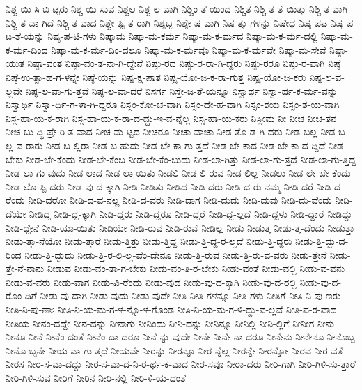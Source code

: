 {ನಿಶ್ಚ-ಯಿ-ಸಿ-ಬಿ-ಟ್ಟರು
ನಿಶ್ಚ-ಯಿ-ಸುವ
ನಿಶ್ಚಲ
ನಿಶ್ಚ-ಲ-ವಾಗಿ
ನಿಶ್ಚಿಂ-ತೆ-ಯಿಂದ
ನಿಶ್ಚಿತ
ನಿಶ್ಚಿ-ತ-ತೆ-ಯಿತ್ತು
ನಿಶ್ಚಿ-ತ-ವಾಗಿ
ನಿಶ್ಚಿ-ತ-ವಾ-ಗಿದೆ
ನಿಶ್ಚಿ-ತ-ವಾದ
ನಿಶ್ಚೇ-ಷ್ಟಿ-ತ-ರಾಗಿ
ನಿಶ್ಶಬ್ದ
ನಿಶ್ಶೇ-ಷ-ವಾಗಿ
ನಿಷ-ತ್ತು-ಗಳನ್ನು
ನಿಷೇಧ
ನಿಷ್ಕ-ಪಟ
ನಿಷ್ಕ-ಪ-ಟ-ತೆ-ಯನ್ನು
ನಿಷ್ಕ-ಪ-ಟಿ-ಗಳು
ನಿಷ್ಕಾಮ
ನಿಷ್ಕಾ-ಮ-ಕರ್ಮ
ನಿಷ್ಕಾ-ಮ-ಕ-ರ್ಮದ
ನಿಷ್ಕಾ-ಮ-ಕ-ರ್ಮ-ದಲ್ಲಿ
ನಿಷ್ಕಾ-ಮ-ಕ-ರ್ಮ-ದಿಂದ
ನಿಷ್ಕಾ-ಮ-ಕ-ರ್ಮ-ದಿಂ-ದಲೂ
ನಿಷ್ಕಾ-ಮ-ಕ-ರ್ಮವೂ
ನಿಷ್ಕಾ-ಮ-ಕ-ರ್ಮವೇ
ನಿಷ್ಕಾ-ಮ-ಸೇವೆ
ನಿಷ್ಠಾ-ಯುತ
ನಿಷ್ಠಾ-ವಂತ
ನಿಷ್ಠಾ-ವಂ-ತ-ನಾ-ಗಿ-ದ್ದೇನೆ
ನಿಷ್ಠು-ರದ
ನಿಷ್ಠು-ರ-ರಾ-ಗಿ-ದ್ದರು
ನಿಷ್ಠು-ರರೂ
ನಿಷ್ಠು-ರ-ವಾಗಿ
ನಿಷ್ಠೆ
ನಿಷ್ಠೆ-ಉ-ತ್ಸಾ-ಹ-ಗ-ಳನ್ನೇ
ನಿಷ್ಠೆ-ಯನ್ನು
ನಿಷ್ಪ-ಕ್ಷ-ಪಾತ
ನಿಷ್ಪ್ರ-ಯೋ-ಜ-ಕ-ರಾ-ಗುತ್ತ
ನಿಷ್ಪ್ರ-ಯೋ-ಜ-ಕರು
ನಿಷ್ಫ-ಲ-ವ-ಲ್ಲವೇ
ನಿಷ್ಫ-ಲ-ವಾ-ಗು-ತ್ತವೆ
ನಿಷ್ಫ-ಲ-ವಾ-ದರೆ
ನಿಸರ್ಗ
ನಿಸ್ತೇ-ಜ-ತೆ-ಯನ್ನೂ
ನಿಸ್ವಾರ್ಥ
ನಿಸ್ವಾ-ರ್ಥ-ಕ-ರ್ಮ-ವನ್ನು
ನಿಸ್ವಾರ್ಥಿ
ನಿಸ್ವಾ-ರ್ಥಿ-ಗ-ಳಾ-ಗಿ-ದ್ದರೂ
ನಿಸ್ಸಂ-ಕೋ-ಚ-ವಾಗಿ
ನಿಸ್ಸಂ-ದೇ-ಹ-ವಾಗಿ
ನಿಸ್ಸಂ-ಶಯ
ನಿಸ್ಸಂ-ಶ-ಯ-ವಾಗಿ
ನಿಸ್ಸ-ಹಾ-ಯ-ಕ-ರಾಗಿ
ನಿಸ್ಸ-ಹಾ-ಯ-ಕ-ರಾ-ದ-ದ್ದು-ಇ-ವ-ನ್ನೆಲ್ಲ
ನಿಸ್ಸ-ಹಾ-ಯ-ಕರು
ನಿಸ್ಸೀಮ
ನೀ
ನೀಚ
ನೀಚ-ತನ
ನೀಚ-ಬು-ದ್ಧಿ-ಪ್ರೇ-ರಿ-ತ-ವಾದ
ನೀಚ-ಮ-ಟ್ಟದ
ನೀಚರೂ
ನೀಚಾ-ವಾಚಾ
ನೀಡ-ತೊ-ಡ-ಗಿ-ದರು
ನೀಡ-ಬಲ್ಲ
ನೀಡ-ಬ-ಲ್ಲ-ವ-ರಾರು
ನೀಡ-ಬ-ಲ್ಲಿರಾ
ನೀಡ-ಬ-ಹುದು
ನೀಡ-ಬೇ-ಕಾ-ಗು-ತ್ತದೆ
ನೀಡ-ಬೇ-ಕಾದ
ನೀಡ-ಬೇ-ಕಾ-ದ-ದ್ದಿದೆ
ನೀಡ-ಬೇಕು
ನೀಡ-ಬೇ-ಕೆಂದು
ನೀಡ-ಬೇ-ಕೆಂಬ
ನೀಡ-ಬೇ-ಕೆಂ-ಬುದು
ನೀಡ-ಲಾ-ಗಿತ್ತು
ನೀಡ-ಲಾ-ಗು-ತ್ತದೆ
ನೀಡ-ಲಾ-ಗು-ತ್ತಿದ್ದ
ನೀಡ-ಲಾ-ಗು-ವುದು
ನೀಡ-ಲಾದ
ನೀಡ-ಲಾ-ಯಿತು
ನೀಡಲಿ
ನೀಡ-ಲಿ-ರುವ
ನೀಡ-ಲಿಲ್ಲ
ನೀಡಲು
ನೀಡ-ಲೇ-ಬೇ-ಕೆಂದು
ನೀಡ-ಲೊ-ಪ್ಪಿ-ದರು
ನೀಡ-ವು-ದ-ಕ್ಕಾಗಿ
ನೀಡಿ
ನೀಡಿತು
ನೀಡಿದ
ನೀಡಿ-ದರು
ನೀಡಿ-ದ-ರು-ನಮ್ಮ
ನೀಡಿ-ದರೆ
ನೀಡಿ-ದ-ರೆಂದು
ನೀಡಿ-ದರೋ
ನೀಡಿ-ದ-ವ-ನಲ್ಲ
ನೀಡಿ-ದ-ವರು
ನೀಡಿ-ದಾಗ
ನೀಡಿ-ದುದು
ನೀಡಿ-ದುವು
ನೀಡಿ-ದು-ವೆಂದು
ನೀಡಿ-ದೆಯೇ
ನೀಡಿದ್ದ
ನೀಡಿ-ದ್ದ-ಕ್ಕಾಗಿ
ನೀಡಿ-ದ್ದರು
ನೀಡಿ-ದ್ದರೂ
ನೀಡಿ-ದ್ದರೆ
ನೀಡಿ-ದ್ದ-ಲ್ಲದೆ
ನೀಡಿ-ದ್ದಳು
ನೀಡಿ-ದ್ದಾರೆ
ನೀಡಿದ್ದು
ನೀಡಿ-ದ್ದೇನೆ
ನೀಡಿ-ಯಾ-ಯಿತು
ನೀಡಿಯೇ
ನೀಡಿ-ರುವ
ನೀಡಿ-ರುವೆ
ನೀಡಿಲ್ಲ
ನೀಡು
ನೀಡುತ್ತ
ನೀಡು-ತ್ತ-ದೆಂದು
ನೀಡುತ್ತಾ
ನೀಡು-ತ್ತಾ-ನೆಯೋ
ನೀಡು-ತ್ತಾರೆ
ನೀಡು-ತ್ತಿತ್ತು
ನೀಡು-ತ್ತಿದ್ದ
ನೀಡು-ತ್ತಿ-ದ್ದ-ರ-ಲ್ಲದೆ
ನೀಡು-ತ್ತಿ-ದ್ದರು
ನೀಡು-ತ್ತಿ-ದ್ದು-ದ-ರಿಂದ
ನೀಡು-ತ್ತಿ-ದ್ದುದು
ನೀಡು-ತ್ತಿ-ರ-ಲಿ-ಲ್ಲ-ವೆಂ-ದೇನೂ
ನೀಡು-ತ್ತಿ-ರುವ
ನೀಡು-ತ್ತಿ-ರು-ವ-ವರು
ನೀಡು-ತ್ತೇನೆ
ನೀಡು-ತ್ತೇ-ನೆ-ನಾನು
ನೀಡುವ
ನೀಡು-ವಂ-ತಾ-ಗ-ಬೇಕು
ನೀಡು-ವಂ-ತಿ-ರ-ಬೇಕು
ನೀಡು-ವಂತೆ
ನೀಡು-ವಲ್ಲಿ
ನೀಡು-ವ-ವನು
ನೀಡು-ವ-ವರು
ನೀಡು-ವಾಗ
ನೀಡು-ವಿ-ರೆಂದು
ನೀಡು-ವುದ
ನೀಡು-ವು-ದ-ಕ್ಕಾಗಿ
ನೀಡು-ವು-ದ-ರಲ್ಲಿ
ನೀಡು-ವು-ದ-ರೊಂ-ದಿಗೆ
ನೀಡು-ವು-ದಾಗಿ
ನೀಡು-ವುದು
ನೀಡು-ವುದೇ
ನೀತಿ
ನೀತಿ-ಗಳನ್ನೂ
ನೀತಿ-ಗಳು
ನೀತಿಗೆ
ನೀತಿ-ನಿ-ಪು-ಣರು
ನೀತಿ-ನಿ-ಪು-ಣಾಃ
ನೀತಿ-ನಿ-ಯ-ಮ-ಗ-ಳ-ನ್ನೊ-ಳ-ಗೊಂಡ
ನೀತಿ-ನಿ-ಯ-ಮ-ಗ-ಳಿ-ದ್ದು-ವ-ಲ್ಲವೆ
ನೀತಿ-ಪ-ರ-ವಾದ
ನೀತಿಯ
ನೀನಂ-ದದ್ದೇ
ನೀನ-ದನ್ನು
ನೀನಾಗು
ನೀನಿಂದು
ನೀನಿ-ದನ್ನು
ನೀನಿನ್ನೂ
ನೀನಿಲ್ಲಿ
ನೀನಿ-ಲ್ಲಿಗೆ
ನೀನೀಗ
ನೀನು
ನೀನೂ
ನೀನೆ
ನೀನೆಂ-ದಂತೆ
ನೀನೆಂ-ದಾ-ದರೂ
ನೀನೆ-ನ್ನು-ವುದೇ
ನೀನೇ
ನೀನೇ-ನಾ-ದರೂ
ನೀನೇನು
ನೀನೇನೂ
ನೀನೊಬ್ಬ
ನೀನೊ-ಬ್ಬನೇ
ನೀಯ-ವಾ-ಗು-ತ್ತದೆ
ನೀಯವೇ
ನೀರನ್ನು
ನೀರನ್ನೂ
ನೀರ-ನ್ನೆಲ್ಲ
ನೀರನ್ನೇ
ನೀರನ್ನೋ
ನೀರವ
ನೀರ-ವತೆ
ನೀರಸ
ನೀರ-ಸ-ವಾ-ದದ್ದು
ನೀರ-ಸ-ವಾ-ದ-ನಿ-ರ-ರ್ಥ-ಕ-ವಾದ
ನೀರ-ಸವೂ
ನೀರಾ-ದರು
ನೀರಿ-ಗಾಗಿ
ನೀರಿ-ಗಿಳಿ-ಸು-ತ್ತಾರೆ
ನೀರಿ-ಗಿಳಿ-ಸುವ
ನೀರಿಗೆ
ನೀರಿನ
ನೀರಿ-ನಲ್ಲಿ
ನೀರಿ-ಳಿ-ಯ-ದಂತೆ
}
